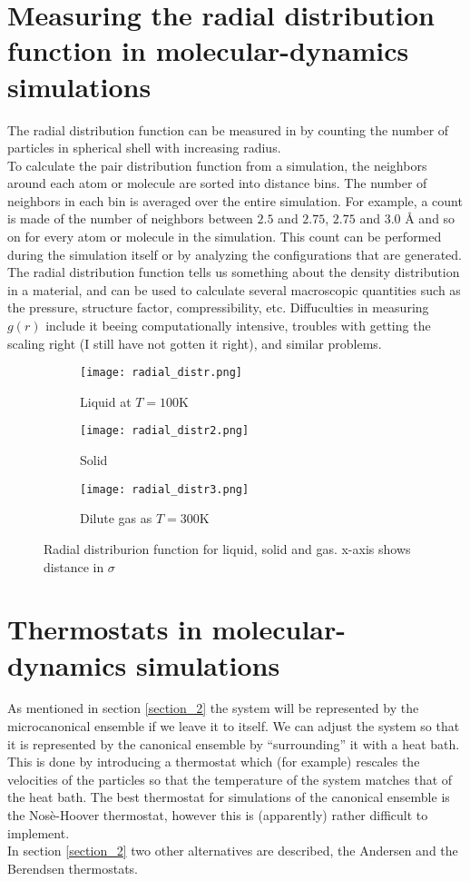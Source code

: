 \documentclass[a4paper,english, 10pt, twoside]{article}
\begin{document}
\section{Measuring the radial distribution function in molecular-dynamics simulations}
The radial distribution function can be measured in by counting the number of particles in spherical shell with 
increasing radius. \\
To calculate the pair distribution function from a simulation, the neighbors around each atom or molecule are sorted 
into distance bins. The number of neighbors in each bin is averaged over the entire simulation. For example, a count 
is made of the number of neighbors between $2.5$ and $2.75$, $2.75$ and $3.0$ Å and so on for every atom or molecule 
in the simulation. This count can be performed during the simulation itself or by analyzing the configurations that 
are generated. \\
The radial distribution function tells us something about the density distribution in a material, and can be used to 
calculate several macroscopic quantities such as the pressure, structure factor, compressibility, etc.
Diffuculties in measuring $g(r)$ include it beeing computationally intensive, troubles with getting the scaling right 
(I still have not gotten it right), and similar problems.
\begin{figure}[H]
\centering
\begin{subfigure}[b]{0.3\textwidth}
    \texttt{[image: radial\_distr.png]}
    \caption{Liquid at $T=100$K}
    \label{g(r):liquid} 
\end{subfigure}
\begin{subfigure}[b]{0.3\textwidth}
    \texttt{[image: radial\_distr2.png]}
    \caption{Solid}
    \label{g(r):solid} 
\end{subfigure}
\begin{subfigure}[b]{0.3\textwidth}
    \texttt{[image: radial\_distr3.png]}
    \caption{Dilute gas as $T=300$K}
    \label{g(r):gas} 
\end{subfigure}
\caption{Radial distriburion function for liquid, solid and gas. x-axis shows distance in $\sigma$}
\label{g(r)}
\end{figure}

\section{Thermostats in molecular-dynamics simulations}
As mentioned in section \ref{section_2} the system will be represented by the microcanonical ensemble if we leave it to 
itself. We can adjust the system so that it is represented by the canonical ensemble by ``surrounding'' it with 
a heat bath. This is done by introducing a thermostat which (for example) rescales the velocities of the particles 
so that the temperature of the system matches that of the heat bath. The best thermostat for simulations of the 
canonical ensemble is the Nosè-Hoover thermostat, however this is (apparently) rather difficult to implement.\\
In section \ref{section_2} two other alternatives are described, the Andersen and the Berendsen thermostats.
\end{document}
